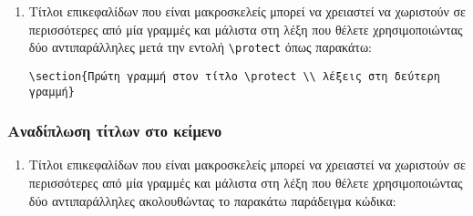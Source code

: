 \begin{refsection}
\begin{enumerate}
\begin{verbatim}
\section[Αυτή η εκδοχή του τίτλου θα εμφανιστεί στον πίνακα περιεχομένων]
{Αυτή η εκδοχή θα εμφανίζεται σαν επικεφαλίδα στο τμήμα του κεφαλαίου}
\end{verbatim}
\item Τίτλοι επικεφαλίδων που είναι μακροσκελείς μπορεί να χρειαστεί να χωριστούν σε περισσότερες από μία
γραμμές και μάλιστα στη λέξη που θέλετε χρησιμοποιώντας δύο αντιπαράλληλες μετά την εντολή \verb=\protect= όπως παρακάτω:
\begin{verbatim}
\section{Πρώτη γραμμή στον τίτλο \protect \\ λέξεις στη δεύτερη γραμμή}
\end{verbatim}
\end{enumerate}

\subsubsection{Αναδίπλωση τίτλων στο κείμενο}
\begin{enumerate}
\item Τίτλοι επικεφαλίδων που είναι μακροσκελείς μπορεί να χρειαστεί να χωριστούν σε περισσότερες από μία
γραμμές και μάλιστα στη λέξη που θέλετε χρησιμοποιώντας δύο αντιπαράλληλες ακολουθώντας το παρακάτω παράδειγμα κώδικα:
\begin{verbatim}

\end{verbatim}
\end{enumerate}
\end{refsection}
